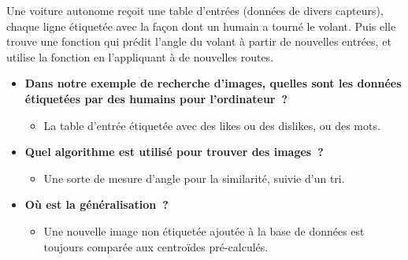 \documentclass[12pt,a4paper]{article}
\begin{document}
\begin{thinkbox}
  Une voiture autonome reçoit une table d'entrées (données de divers capteurs), chaque ligne étiquetée avec la façon dont un humain a tourné le volant. Puis elle trouve une fonction qui prédit l'angle du volant à partir de nouvelles entrées, et utilise la fonction en l'appliquant à de nouvelles routes.

  \begin{itemize}
    \item \textbf{Dans notre exemple de recherche d'images, quelles sont les données étiquetées par des humains pour l'ordinateur~?}
    \begin{itemize}
      \item La table d'entrée étiquetée avec des likes ou des dislikes, ou des mots.
    \end{itemize}
    \item \textbf{Quel algorithme est utilisé pour trouver des images~?}
    \begin{itemize}
      \item Une sorte de mesure d'angle pour la similarité, suivie d'un tri.
    \end{itemize}
    \item \textbf{Où est la généralisation~?}
    \begin{itemize}
      \item Une nouvelle image non étiquetée ajoutée à la base de données est toujours comparée aux centroïdes pré-calculés.
    \end{itemize}
  \end{itemize}
\end{thinkbox}
\end{document}
